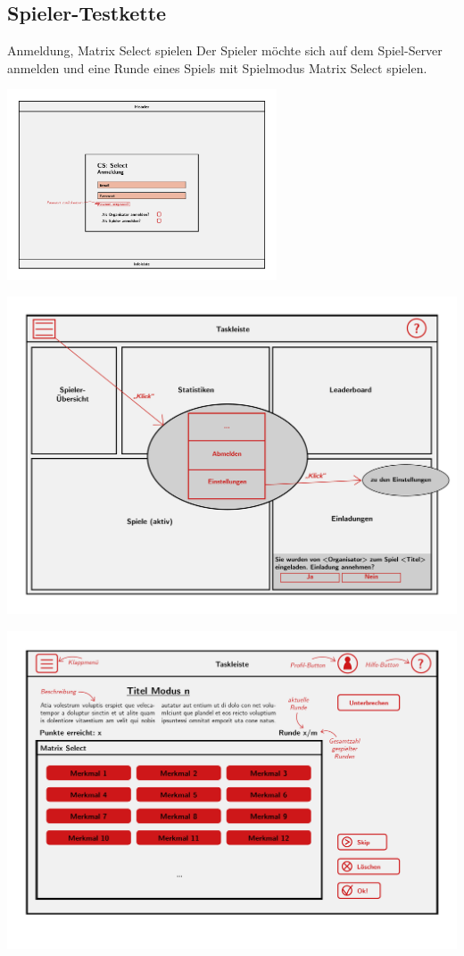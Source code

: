 \documentclass[xcolor=dvipsnames]{beamer}
\begin{document}
    \subsection{Spieler-Testkette} 
    \begin{frame}
    	\begin{block}{Anmeldung, Matrix Select spielen}
    		Der Spieler möchte sich auf dem Spiel-Server anmelden und eine Runde eines Spiels mit Spielmodus Matrix Select spielen.
    	\end{block}
    	\includegraphics[width=8cm]{../../pictures/Anmeldung.jpg}
    \end{frame}
	\begin{frame}
	\includegraphics[width=\textwidth]{../../pictures/5_Spieler.jpg}
	\end{frame}
	\begin{frame}
	\includegraphics[width=\textwidth]{../../pictures/MatrixSelect.jpg}
	\end{frame}
\end{document}
